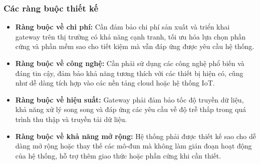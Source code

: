         \subsubsection{Các ràng buộc thiết kế}
            \begin{itemize}
                \item \textbf{Ràng buộc về chi phí:} Cần đảm bảo chi phí sản xuất và triển khai gateway trên thị trường có khả năng cạnh tranh, tối ưu hóa lựa chọn phần cứng và phần mềm sao cho tiết kiệm mà vẫn đáp ứng được yêu cầu hệ thống.
                \item \textbf{Ràng buộc về công nghệ:} Cần phải sử dụng các công nghệ phổ biến và đáng tin cậy, đảm bảo khả năng tương thích với các thiết bị hiện có, cũng như dễ dàng tích hợp vào các nền tảng cloud hoặc hệ thống IoT.
                \item \textbf{Ràng buộc về hiệu suất:} Gateway phải đảm bảo tốc độ truyền dữ liệu, khả năng xử lý song song và đáp ứng các yêu cầu về độ trễ thấp trong quá trình thu thập và truyền tải dữ liệu.
                \item \textbf{Ràng buộc về khả năng mở rộng:} Hệ thống phải được thiết kế sao cho dễ dàng mở rộng hoặc thay thế các mô-đun mà không làm gián đoạn hoạt động của hệ thống, hỗ trợ thêm giao thức hoặc phần cứng khi cần thiết.
            \end{itemize}

